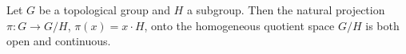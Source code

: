 Let $G$ be a topological group and $H$ a subgroup. Then the natural projection $\pi: G \to G/H$, $\pi(x) = x \cdot H$, onto the homogeneous quotient space $G/H$ is both open and continuous.
